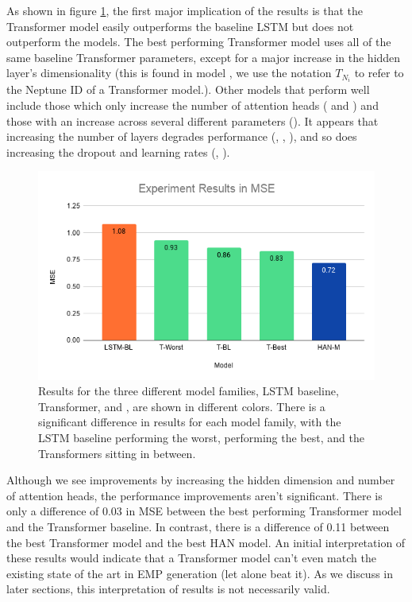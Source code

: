 As shown in figure \ref{fig:experiment_results}, the first major implication of the results is that the Transformer model easily outperforms the baseline LSTM but does not outperform the \vnet{} models. The best performing Transformer model uses all of the same baseline Transformer parameters, except for a major increase in the hidden layer's dimensionality (this is found in model , we use the notation $T_{N_{i}}$ to refer to the Neptune ID of a Transformer model.). Other models that perform well include those which only increase the number of attention heads ( and ) and those with an increase across several different parameters (). It appears that increasing the number of layers degrades performance (, , ), and so does increasing the dropout and learning rates (, ). 

\begin{figure}[!b]
    \centering
    \includegraphics[width=0.8\linewidth]{figs/ch5/experiment_results.png}
    \caption{Results for the three different model families, LSTM baseline, Transformer, and \vnet{}, are shown in different colors. There is a significant difference in results for each model family, with the LSTM baseline performing the worst, \vnet{} performing the best, and the Transformers sitting in between.}
    \label{fig:experiment_results}
\end{figure}

Although we see improvements by increasing the hidden dimension and number of attention heads, the performance improvements aren't significant. There is only a difference of 0.03 in MSE between the best performing Transformer model and the Transformer baseline. In contrast, there is a difference of 0.11 between the best Transformer model and the best HAN model. An initial interpretation of these results would indicate that a Transformer model can't even match the existing state of the art in EMP generation (let alone beat it). As we discuss in later sections, this interpretation of results is not necessarily valid. 
